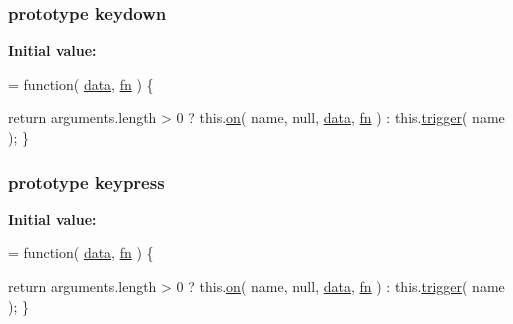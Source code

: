 \subsubsection[{keydown}]{ {\bf prototype} keydown}\label{jquery-1_810_82-vsdoc_8js_af982393c1b8eb2a9ba4c7337f625ad89}
{\bfseries Initial value\+:}
\begin{DoxyCode}
= \textcolor{keyword}{function}( \hyperlink{jquery-1_810_82-vsdoc_8js_a609407b3456fdc3c5671a9fc4a226ff7}{data}, \hyperlink{jquery-1_810_82-vsdoc_8js_acef6bdaf6b9b20fdcca1ea86f0902c3b}{fn} ) \{


        \textcolor{keywordflow}{return} arguments.length > 0 ?
            this.\hyperlink{jquery-1_810_82-vsdoc_8js_ae453b412b883f60220d73468ef6c6dbc}{on}( name, null, \hyperlink{jquery-1_810_82-vsdoc_8js_a609407b3456fdc3c5671a9fc4a226ff7}{data}, \hyperlink{jquery-1_810_82-vsdoc_8js_acef6bdaf6b9b20fdcca1ea86f0902c3b}{fn} ) :
            this.\hyperlink{jquery-1_810_82-vsdoc_8js_a2388c4114d5e3e4eab020f973641519c}{trigger}( name );
    \}
\end{DoxyCode}
\hypertarget{jquery-1_810_82-vsdoc_8js_a617a8713f64ec1d97c7abe00cbae31e4}{}
\subsubsection[{keypress}]{ {\bf prototype} keypress}\label{jquery-1_810_82-vsdoc_8js_a617a8713f64ec1d97c7abe00cbae31e4}
{\bfseries Initial value\+:}
\begin{DoxyCode}
= \textcolor{keyword}{function}( \hyperlink{jquery-1_810_82-vsdoc_8js_a609407b3456fdc3c5671a9fc4a226ff7}{data}, \hyperlink{jquery-1_810_82-vsdoc_8js_acef6bdaf6b9b20fdcca1ea86f0902c3b}{fn} ) \{


        \textcolor{keywordflow}{return} arguments.length > 0 ?
            this.\hyperlink{jquery-1_810_82-vsdoc_8js_ae453b412b883f60220d73468ef6c6dbc}{on}( name, null, \hyperlink{jquery-1_810_82-vsdoc_8js_a609407b3456fdc3c5671a9fc4a226ff7}{data}, \hyperlink{jquery-1_810_82-vsdoc_8js_acef6bdaf6b9b20fdcca1ea86f0902c3b}{fn} ) :
            this.\hyperlink{jquery-1_810_82-vsdoc_8js_a2388c4114d5e3e4eab020f973641519c}{trigger}( name );
    \}
\end{DoxyCode}
\hypertarget{jquery-1_810_82-vsdoc_8js_a807aea8640f7889d0e97428a1ee2c637}{}
